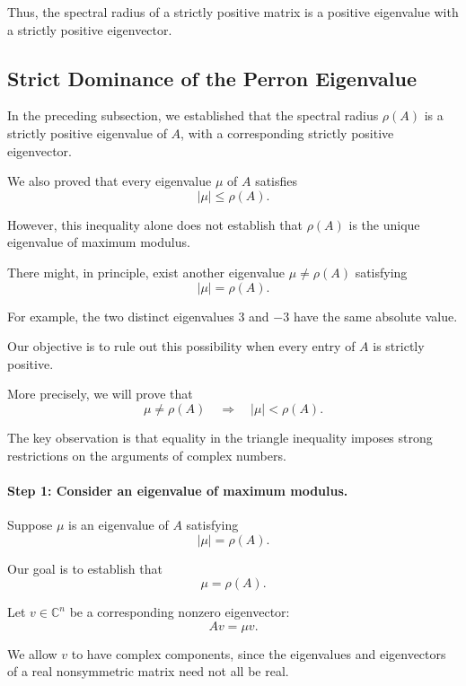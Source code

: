 \documentclass[11pt,a4paper]{article}
\theoremstyle{definition}
\theoremstyle{remark}
\begin{document}
Thus, the spectral radius
of a strictly positive matrix
is a positive eigenvalue
with a strictly positive
eigenvector.

\subsection{Strict Dominance of the Perron Eigenvalue}

In the preceding subsection, we established
that the spectral radius $\rho(A)$ is a
strictly positive eigenvalue of $A$,
with a corresponding strictly positive
eigenvector.

We also proved that every eigenvalue
$\mu$ of $A$ satisfies
\[
|\mu|\leq\rho(A).
\]

However, this inequality alone does not
establish that $\rho(A)$ is the unique
eigenvalue of maximum modulus.

There might, in principle, exist another
eigenvalue $\mu\neq\rho(A)$ satisfying
\[
|\mu|=\rho(A).
\]

For example, the two distinct eigenvalues
$3$ and $-3$ have the same absolute value.

Our objective is to rule out this possibility
when every entry of $A$ is strictly positive.

More precisely, we will prove that
\[
\boxed{
\mu\neq\rho(A)
\quad\Longrightarrow\quad
|\mu|<\rho(A).
}
\]

The key observation is that equality
in the triangle inequality imposes
strong restrictions on the arguments
of complex numbers.


\paragraph{Step 1: Consider an eigenvalue
of maximum modulus.}

Suppose $\mu$ is an eigenvalue of $A$
satisfying
\begin{equation}
|\mu|=\rho(A).
\label{eq:perron_equal_modulus}
\end{equation}

Our goal is to establish that
\[
\mu=\rho(A).
\]

Let $v\in\mathbb{C}^n$ be a corresponding
nonzero eigenvector:
\begin{equation}
Av=\mu v.
\label{eq:perron_complex_eigenvector}
\end{equation}

We allow $v$ to have complex components,
since the eigenvalues and eigenvectors
of a real nonsymmetric matrix
need not all be real.
\end{document}
